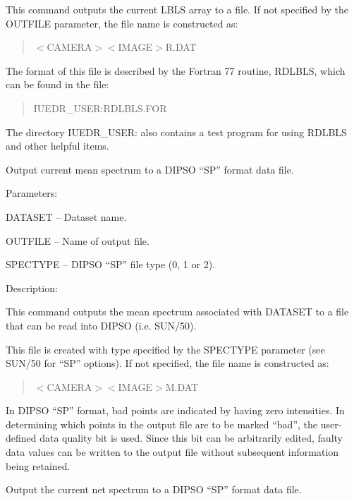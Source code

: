 \begin {description}
\begin {description}
This command outputs the current LBLS array 
to a file.
If not specified by the OUTFILE parameter, the file name is constructed as:

\begin {quote}
$<$CAMERA$><$IMAGE$>$R.DAT
\end {quote}
The format of this file is described by the Fortran 77 routine, RDLBLS, which
can be found in the file:

\begin {quote}
IUEDR\_USER:RDLBLS.FOR
\end {quote}
The directory IUEDR\_USER: also contains a test
program for using RDLBLS and other helpful items.
\end {description}

\item [OUTMEAN]
Output current mean spectrum to a DIPSO ``SP'' format data file.

\begin {description}
\item Parameters:

\begin {description}
\item DATASET -- Dataset name.
\item OUTFILE -- Name of output file.
\item SPECTYPE -- DIPSO ``SP'' file type (0, 1 or 2).
\end {description}

\item Description:

This command outputs the mean spectrum associated with 
DATASET to a file that can be read into DIPSO (i.e. SUN/50).

This file is created with type specified
by the SPECTYPE parameter (see SUN/50 for ``SP'' options). 
If not specified, the file name is constructed as:

\begin {quote}
$<$CAMERA$><$IMAGE$>$M.DAT
\end {quote}
In DIPSO ``SP'' format, bad points are indicated by having zero intensities.
In determining which points in the output file are to be marked
``bad'', the user-defined data quality bit is used.
Since this bit can be arbitrarily edited,
faulty data values can be written to the output file 
without subsequent information being retained.
\end {description}

\item [OUTNET]
Output the current net spectrum to a DIPSO  ``SP'' format data file.


\end{description}
